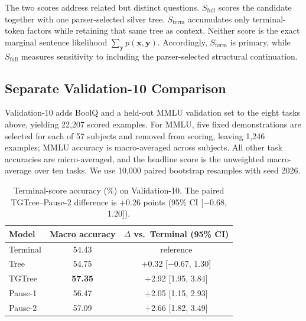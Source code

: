 \documentclass[11pt]{article}
\begin{document}
The two scores address related but distinct questions. $S_{\text{full}}$ scores the candidate together with one parser-selected silver tree. $S_{\text{term}}$ accumulates only terminal-token factors while retaining that same tree as context. Neither score is the exact marginal sentence likelihood $\sum_{\mathbf{y}}p(\mathbf{x},\mathbf{y})$. Accordingly, $S_{\text{term}}$ is primary, while $S_{\text{full}}$ measures sensitivity to including the parser-selected structural continuation.

\subsection{Separate Validation-10 Comparison}
\label{sec:validation10}

Validation-10 adds BoolQ and a held-out MMLU validation set to the eight tasks above, yielding 22,207 scored examples. For MMLU, five fixed demonstrations are selected for each of 57 subjects and removed from scoring, leaving 1,246 examples; MMLU accuracy is macro-averaged across subjects. All other task accuracies are micro-averaged, and the headline score is the unweighted macro-average over ten tasks. We use 10,000 paired bootstrap resamples with seed 2026.

\begin{table}[htbp]
  \centering
  \small
  \setlength{\tabcolsep}{6pt}
  \begin{tabular}{lcc}
    \toprule
    Model & Macro accuracy & $\Delta$ vs.\ Terminal (95\% CI) \\
    \midrule
    Terminal & 54.43 & reference \\
    Tree & 54.75 & +0.32 [$-$0.67, 1.30] \\
    TGTree & \textbf{57.35} & +2.92 [1.95, 3.84] \\
    Pause-1 & 56.47 & +2.05 [1.15, 2.93] \\
    Pause-2 & 57.09 & +2.66 [1.82, 3.49] \\
    \bottomrule
  \end{tabular}
  \caption{Terminal-score accuracy (\%) on Validation-10. The paired TGTree--Pause-2 difference is +0.26 points (95\% CI [$-$0.68, 1.20]).}
  \label{tab:validation10}
\end{table}
\end{document}
